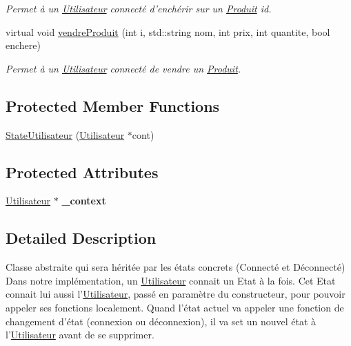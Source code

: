 \begin{DoxyCompactItemize}
\begin{DoxyCompactList}\small\item\em Permet à un \hyperlink{classUtilisateur}{Utilisateur} connecté d'enchérir sur un \hyperlink{classProduit}{Produit} id. \end{DoxyCompactList}\item 
virtual void \hyperlink{classStateUtilisateur_aa039ece92cb1663b9badf6ce4926fe1c}{vendre\-Produit} (int i, std\-::string nom, int prix, int quantite, bool enchere)
\begin{DoxyCompactList}\small\item\em Permet à un \hyperlink{classUtilisateur}{Utilisateur} connecté de vendre un \hyperlink{classProduit}{Produit}. \end{DoxyCompactList}\end{DoxyCompactItemize}
\subsection*{Protected Member Functions}
\begin{DoxyCompactItemize}
\item 
\hyperlink{classStateUtilisateur_a336272db2eba31466abb07ae866f55d4}{State\-Utilisateur} (\hyperlink{classUtilisateur}{Utilisateur} $\ast$cont)
\end{DoxyCompactItemize}
\subsection*{Protected Attributes}
\begin{DoxyCompactItemize}
\item 
\hypertarget{classStateUtilisateur_a7ba23f1ccfadd18e04bdc2ab2653b845}{\hyperlink{classUtilisateur}{Utilisateur} $\ast$ {\bfseries \-\_\-context}}\label{classStateUtilisateur_a7ba23f1ccfadd18e04bdc2ab2653b845}

\end{DoxyCompactItemize}


\subsection{Detailed Description}
Classe abstraite qui sera héritée par les états concrets (Connecté et Déconnecté) Dans notre implémentation, un \hyperlink{classUtilisateur}{Utilisateur} connait un Etat à la fois. Cet Etat connait lui aussi l'\hyperlink{classUtilisateur}{Utilisateur}, passé en paramètre du constructeur, pour pouvoir appeler ses fonctions localement. Quand l'état actuel va appeler une fonction de changement d'état (connexion ou déconnexion), il va set un nouvel état à l'\hyperlink{classUtilisateur}{Utilisateur} avant de se supprimer. 

